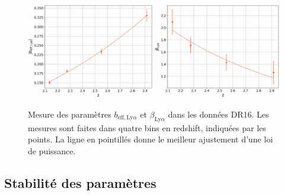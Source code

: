\documentclass[11pt, twoside, a4paper, openright]{report}
\begin{document}
\begin{figure}
  \centering
  \includegraphics[scale=0.44]{bias_vs_z}
  \label{fig:bias_vs_z}
  \caption{Mesure des paramètres $b_{\mathrm{eff},\mathrm{Ly}\alpha}$ et $\beta_{\mathrm{Ly}\alpha}$ dans les données DR16. Les mesures sont faites dans quatre bins en redshift, indiquées par les points. La ligne en pointillés donne le meilleur ajustement d'une loi de puissance.}
\end{figure}





\subsection{Stabilité des paramètres \lya{}}
\label{subsec:stab_pars_lya}
\end{document}
